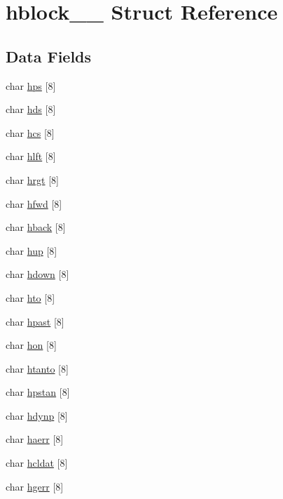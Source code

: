 \hypertarget{structhblock__1__}{}\section{hblock\+\_\+\_\+ Struct Reference}
\label{structhblock__1__}
\subsection*{Data Fields}
\begin{DoxyCompactItemize}
\item 
char \hyperlink{structhblock__1___ad5670a31767af89eee5b5ae6b4a86dc2}{hps} \mbox{[}8\mbox{]}
\item 
char \hyperlink{structhblock__1___ab33cb6933abdacdc030e505b91470de1}{hds} \mbox{[}8\mbox{]}
\item 
char \hyperlink{structhblock__1___ad66eb3b47332bf61d0ff0db49bdfb3d7}{hcs} \mbox{[}8\mbox{]}
\item 
char \hyperlink{structhblock__1___a3c9dee6e59b74aae4d1fdf3e7b83d37e}{hlft} \mbox{[}8\mbox{]}
\item 
char \hyperlink{structhblock__1___a8462413668b7c2a4dc2ce2e1514fd865}{hrgt} \mbox{[}8\mbox{]}
\item 
char \hyperlink{structhblock__1___aa7092417f940aeb740ad13c1c86a4372}{hfwd} \mbox{[}8\mbox{]}
\item 
char \hyperlink{structhblock__1___a27822d05cc44affce49322f1068db966}{hback} \mbox{[}8\mbox{]}
\item 
char \hyperlink{structhblock__1___aefd21ab91218c2fa1a2b9da0121fe9dc}{hup} \mbox{[}8\mbox{]}
\item 
char \hyperlink{structhblock__1___a7143e624c8dd1fe2e9f957c2c687e8e3}{hdown} \mbox{[}8\mbox{]}
\item 
char \hyperlink{structhblock__1___a762da4c87f0fc9b43541f727d33abc48}{hto} \mbox{[}8\mbox{]}
\item 
char \hyperlink{structhblock__1___a10f1f2cc1e48d113009e1def46492d5c}{hpast} \mbox{[}8\mbox{]}
\item 
char \hyperlink{structhblock__1___a89696ad55a2da881a03804750e63ccd8}{hon} \mbox{[}8\mbox{]}
\item 
char \hyperlink{structhblock__1___a19d01900d5c46cce77c178727367e910}{htanto} \mbox{[}8\mbox{]}
\item 
char \hyperlink{structhblock__1___a75441239bebb0a3ef564a8aa4fed3c4a}{hpstan} \mbox{[}8\mbox{]}
\item 
char \hyperlink{structhblock__1___ad1459eb479fc1ac9cc503ff1492b9e94}{hdynp} \mbox{[}8\mbox{]}
\item 
char \hyperlink{structhblock__1___aa43ed56a60d89fba4ae9f711e74c5b1b}{haerr} \mbox{[}8\mbox{]}
\item 
char \hyperlink{structhblock__1___a01a97037d319c58a41d05e18fdb709c8}{hcldat} \mbox{[}8\mbox{]}
\item 
char \hyperlink{structhblock__1___acd7958aeadc86997c52e870647416f86}{hgerr} \mbox{[}8\mbox{]}
\end{DoxyCompactItemize}


